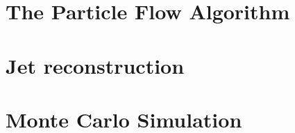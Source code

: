 \section{The Particle Flow Algorithm}
\section{Jet reconstruction}
\section{Monte Carlo Simulation}
